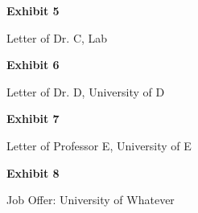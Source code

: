 \documentclass{article}
\begin{document}
% 



\vspace*{\fill}
\begin{center}

{\LARGE \bf
Exhibit 5
}

\vspace{10\baselineskip}

{\large  Letter of Dr. C, Lab}

\end{center}
\vspace*{\fill}


% 




\vspace*{\fill}
\begin{center}

{\LARGE \bf
Exhibit 6
}

\vspace{10\baselineskip}

{\large Letter of Dr. D, University of D}

\end{center}
\vspace*{\fill}

% 




\vspace*{\fill}
\begin{center}

{\LARGE \bf
Exhibit 7
}

\vspace{10\baselineskip}

{\large Letter of Professor E, University of E}

\end{center}
\vspace*{\fill}

% 




\vspace*{\fill}
\begin{center}

{\LARGE \bf
Exhibit 8
}

\vspace{10\baselineskip}

{\large Job Offer: University of Whatever}

\end{center}
\vspace*{\fill}
\end{document}
